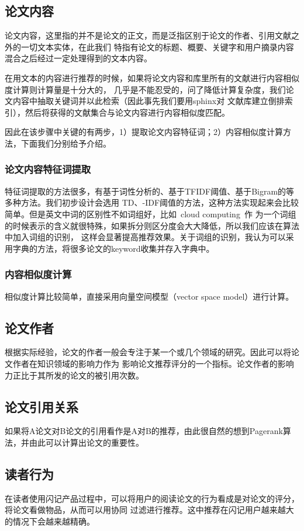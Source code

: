 \documentclass[a4paper]{article}
\begin{document}
\subsection{论文内容}
论文内容，这里指的并不是论文的正文，而是泛指区别于论文的作者、引用文献之外的一切文本实体，在此我们%
特指有论文的标题、概要、关键字和用户摘录内容混合之后经过一定处理得到的文本内容。

在用文本的内容进行推荐的时候，如果将论文内容和库里所有的文献进行内容相似度计算则计算量是十分大的，%
几乎是不能忍受的，问了降低计算复杂度，我们论文内容中抽取关键词并以此检索（因此事先我们要用sphinx对%
文献库建立倒排索引），然后将获得的文献集合与论文内容进行内容相似度匹配。

因此在该步骤中关键的有两步，1）提取论文内容特征词；2）内容相似度计算方法，下面我们分别给予介绍。
\subsubsection{论文内容特征词提取}
特征词提取的方法很多，有基于词性分析的、基于TF\-IDF阈值、基于Bigram的等多种方法。我们初步设计会选用%
TD、-IDF阈值的方法，这种方法实现起来会比较简单。但是英文中词的区别性不如词组好，比如~cloud computing~作%
为一个词组的时候表示的含义就很特殊，如果拆分则区分度会大大降低，所以我们应该在算法中加入词组的识别，%
这样会显著提高推荐效果。关于词组的识别，我认为可以采用字典的方法，将很多论文的keyword收集并存入字典中。%
\subsubsection{内容相似度计算}
相似度计算比较简单，直接采用向量空间模型（vector space model）进行计算。
\subsection{论文作者}
根据实际经验，论文的作者一般会专注于某一个或几个领域的研究。因此可以将论文作者在知识领域的影响力作为%
影响论文推荐评分的一个指标。论文作者的影响力正比于其所发的论文的被引用次数。
\subsection{论文引用关系}
如果将A论文对B论文的引用看作是A对B的推荐，由此很自然的想到Pagerank算法，并由此可以计算出论文的重要性。
\subsection{读者行为}
在读者使用闪记产品过程中，可以将用户的阅读论文的行为看成是对论文的评分，将论文看做物品，从而可以用协同%
过滤进行推荐。这中推荐在闪记用户越来越大的情况下会越来越精确。
\end{document}
